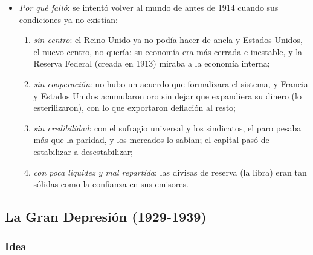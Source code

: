 \documentclass[11pt]{article}
\begin{document}
\begin{itemize}
\item \emph{Por qué falló}: se intentó volver al mundo de antes de 1914 cuando sus condiciones ya no existían\nocite{Eichengreen1992Golden}:
  \begin{enumerate}
  \item \emph{sin centro}: el Reino Unido ya no podía hacer de ancla y Estados Unidos, el nuevo centro, no quería: su economía era más cerrada e inestable, y la Reserva Federal (creada en 1913) miraba a la economía interna;
  \item \emph{sin cooperación}: no hubo un acuerdo que formalizara el sistema, y Francia y Estados Unidos acumularon oro sin dejar que expandiera su dinero (lo esterilizaron), con lo que exportaron deflación al resto\nocite{Irwin2012France};
  \item \emph{sin credibilidad}: con el sufragio universal y los sindicatos, el paro pesaba más que la paridad, y los mercados lo sabían; el capital pasó de estabilizar a desestabilizar;
  \item \emph{con poca liquidez y mal repartida}: las divisas de reserva (la libra) eran tan sólidas como la confianza en sus emisores.
  \end{enumerate}
\end{itemize}

\subsection{La Gran Depresión (1929-1939)}\label{sec:gran-depresion}

\subsubsection{Idea}
\end{document}
